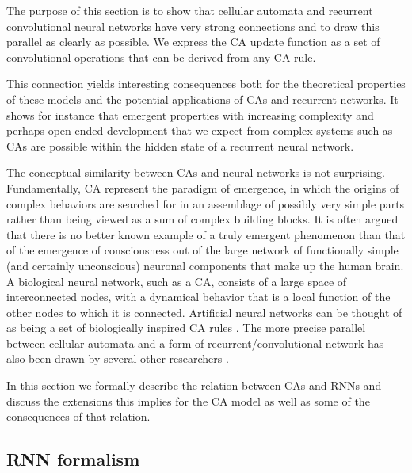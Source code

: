 The purpose of this section is to show that cellular automata and recurrent
convolutional neural networks have very strong connections and to draw this
parallel as clearly as possible. We express the \ac{CA} update function as a set
of convolutional operations that can be derived from any \ac{CA} rule.

This connection yields interesting consequences both for the theoretical
properties of these models and the potential applications of \acp{CA} and
recurrent networks. It shows for instance that emergent properties with
increasing complexity and perhaps open-ended development that we expect from
complex systems such as \acp{CA} are possible within the hidden state of a
recurrent neural network.

The conceptual similarity between \acp{CA} and neural networks is not surprising. 
Fundamentally, \ac{CA} represent the paradigm of emergence, in which
the origins of complex behaviors are searched for in an assemblage of possibly
very simple parts rather than being viewed as a sum of complex building blocks. It is
often argued that there is no better known example of a truly emergent
phenomenon than that of the emergence of consciousness out of the large network
of functionally simple (and certainly unconscious) neuronal components that make
up the human brain. A biological neural network, such as a \ac{CA}, consists of a
large space of interconnected nodes, with a dynamical behavior that is a local
function of the other nodes to which it is connected. Artificial neural networks can
be thought of as being a set of biologically inspired CA rules
\parencite{ilachinskiCellularAutomataDiscrete2001}. The more precise parallel
between cellular automata and a form of recurrent/convolutional network has also
been drawn by several other researchers
\parencite{wulffLearningCellularAutomaton1993,
  gilpinCellularAutomataConvolutional2018,
  mordvintsevGrowingNeuralCellular2020}.

In this section we formally describe the relation between \acp{CA} and \acp{RNN}
and discuss the extensions this implies for the \ac{CA} model as well as some of
the consequences of that relation.

\subsection{RNN formalism}

